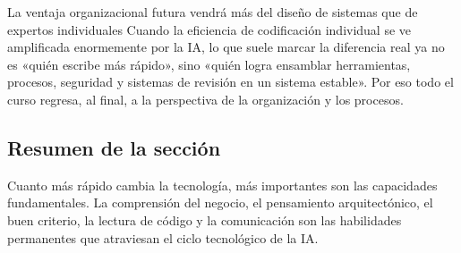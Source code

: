 \begin{knowledgebox}{La ventaja organizacional futura vendrá más del diseño de sistemas que de expertos individuales}
Cuando la eficiencia de codificación individual se ve amplificada enormemente por la IA, lo que suele marcar la diferencia real ya no es «quién escribe más rápido», sino «quién logra ensamblar herramientas, procesos, seguridad y sistemas de revisión en un sistema estable». Por eso todo el curso regresa, al final, a la perspectiva de la organización y los procesos.
\end{knowledgebox}

\subsection{Resumen de la sección}

Cuanto más rápido cambia la tecnología, más importantes son las capacidades fundamentales. La comprensión del negocio, el pensamiento arquitectónico, el buen criterio, la lectura de código y la comunicación son las habilidades permanentes que atraviesan el ciclo tecnológico de la IA.

